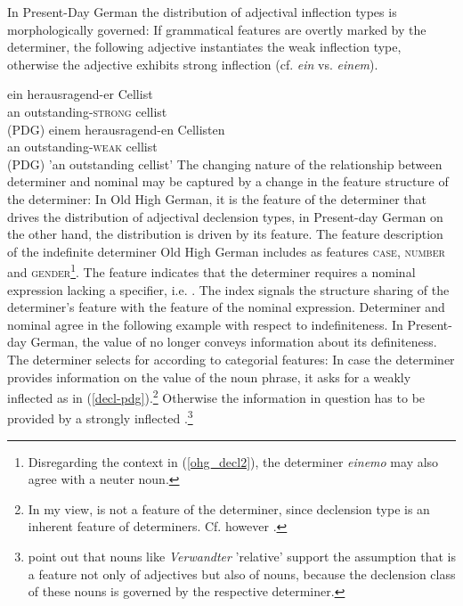 \documentclass[output=paper]{langsci/langscibook}
\begin{document}
\zl
In Present-Day German the distribution of adjectival inflection types is morphologically governed: If grammatical features are overtly marked by the determiner, the following adjective instantiates the weak inflection type, otherwise the adjective exhibits strong inflection (cf. \textit{ein} vs. \textit{einem}).
       
\eal
\ex 
\gll ein herausragend-er Cellist  \\ an outstanding-\textsc{strong} cellist\\  \hfill (PDG)
\ex
\gll einem herausragend-en Cellisten \\ an outstanding-\textsc{weak} {cellist}\\ \hfill (PDG)
\glt 'an outstanding cellist'
\zl
The changing nature of the relationship between determiner and nominal may be captured by a change in the feature structure of the determiner: In Old High German, it is the \content feature of the determiner that drives the distribution of adjectival declension types, in Present-day German on the other hand, the distribution is driven by its \cat feature. The feature description of the indefinite determiner Old High German includes as \AGR features \textsc{case}, \textsc{number} and \textsc{gender}\footnote{Disregarding the context in (\ref{ohg_decl2}), the determiner \textit{einemo} may also agree with a neuter noun.}. The feature \spr indicates that the determiner requires a nominal expression lacking a specifier, i.e. \nom \citep{SaWaBe2003}. The index  signals the structure sharing of the determiner's \content feature with the \decl feature of the nominal expression. Determiner and nominal agree in the following example with respect to indefiniteness.
\ea 
{}
\z 
In Present-day German, the \decl value of \nom no longer conveys information about its definiteness. The determiner selects for \nom according to categorial features: In case the determiner provides information on the \AGR value of the noun phrase, it asks for a weakly inflected \nom as in (\ref{decl-pdg}).\footnote{In my view, \decl is not a \head feature of the determiner, since  declension type is an inherent feature of determiners. Cf. however \cite[72]{kiss1995}.} Otherwise the information in question has to be provided by a strongly inflected \nom.\footnote{\cite[373]{PoSa94} point out that nouns like \textit{Verwandter} 'relative' support the assumption that \decl is a feature not only of adjectives but also of nouns, because the declension class of these nouns is governed by the respective determiner.} 
\end{document}
